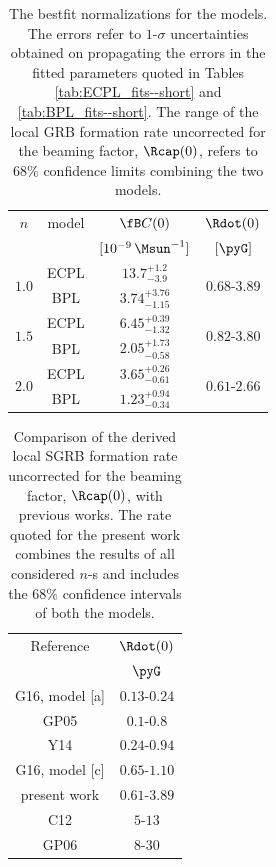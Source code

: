 \begin{table}
\caption[Bestfit normalizations for the models]{The bestfit normalizations for the models. The errors refer to $1$-$\sigma$ uncertainties obtained on propagating the errors in the fitted parameters quoted in Tables \ref{tab:ECPL_fits--short} and \ref{tab:BPL_fits--short}. The range of the local GRB formation rate uncorrected for the beaming factor, $\Rcap(0)$, refers to $68 \%$ confidence limits combining the two models.}
\label{tab:fBC0_fits--short}
\begin{center}
\begin{tabular}{|c|c|c|c|}
\hline 
$n$ & model & $\fB C(0)$ & $\Rdot(0)$ \\
 & & $[10^{-9} \, \Msun^{-1} ]$ & $ [\pyG] $ \\
\hline
\multirow{2}{*}{$1.0$} & ECPL & $13.7 ^{+1.2} _{-3.9}$ & \multirow{2}{*}{$0.68$-$3.89$} \\
 & BPL & $3.74 ^{+3.76} _{-1.15}$ & \\
\hline
\multirow{2}{*}{$1.5$} & ECPL & $6.45 ^{+0.39} _{-1.32}$ & \multirow{2}{*}{$0.82$-$3.80$} \\
 & BPL & $2.05 ^{+1.73} _{-0.58}$ & \\
\hline
\multirow{2}{*}{$2.0$} & ECPL & $3.65 ^{+0.26} _{-0.61}$ & \multirow{2}{*}{$0.61$-$2.66$} \\
 & BPL & $1.23 ^{+0.94} _{-0.34}$ & \\
\hline
\end{tabular}
\end{center}
\end{table}

\begin{table}
\caption[The local short GRB formation rate]{Comparison of the derived local SGRB formation rate uncorrected for the beaming factor, $\Rcap(0)$, with previous works. The rate quoted for the present work combines the results of all considered $n$-s and includes the $68 \%$ confidence intervals of both the models.}
\label{tab:rate_comparison}
\begin{center}
\begin{tabular}{|c|c|}
\hline 
Reference & $\Rdot(0)$ \\
 & $\pyG$ \\
\hline
\hline
G16, model [a] & $0.13$-$0.24$ \\
\hline
GP05 & $0.1$-$0.8$ \\
Y14 & $0.24$-$0.94$ \\
G16, model [c] & $0.65$-$1.10$ \\
present work & $0.61$-$3.89$ \\
\hline
C12 & $5$-$13$ \\
GP06 & $8$-$30$ \\
\hline
\end{tabular}
\end{center}
\end{table}


